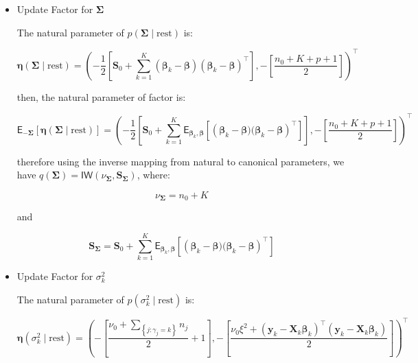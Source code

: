 \begin{appendix}
\begin{itemize}
and

\begin{equation}
\bm{\mu}_{\bm{\beta}}= \left[\bm{\Lambda}_0^{-1}   + \sum_{k=1}^{K}\mathsf{E}_{\bm{\Sigma}}\left[\bm{\Sigma}^{-1}\right]  \right]^{-1}\left[\bm{\Lambda}_0^{-1} \bm{\mu}_0 + \sum_{k=1}^{K}\mathsf{E}_{\bm{\Sigma}}\left[\bm{\Sigma}^{-1}\right] \mathsf{E}_{\bm{\beta}_k}\left[\bm{\beta}_k \right]\right]
\end{equation}

\item Update Factor for $\bm{\Sigma}$

The natural parameter of $p(\bm{\Sigma}\mid \text{rest}) $ is:

\begin{equation}
\bm{\eta}(\bm{\Sigma}\mid \text{rest})=\left(-\frac{1}{2}\left[ \bm{S}_0 + \sum_{k=1}^{K} (\bm{\beta}_k - \bm{\beta})(\bm{\beta}_k - \bm{\beta})^\top\right],-\left[\frac{n_0 + K + p + 1}{2}\right]\right)^\top
\end{equation}

then, the natural parameter of factor is:

\begin{equation}
\mathsf{E}_{-\bm{\Sigma}}\left[\bm{\eta}(\bm{\Sigma}\mid \text{rest})\right]=\left(-\frac{1}{2}\left[ \bm{S}_0 + \sum_{k=1}^{K} \mathsf{E}_{\bm{\beta}_k,\bm{\beta}}\left[\left(\bm{\beta}_k - \bm{\beta})(\bm{\beta}_k - \bm{\beta}\right)^\top\right]\right],-\left[\frac{n_0 + K + p + 1}{2}\right]\right)^\top
\end{equation}

therefore using the inverse mapping from natural to canonical parameters, we have $q(\bm{\Sigma})=\mathsf{IW}(\nu_{\bm{\Sigma}},\bm{S}_{\bm{\Sigma}})$, where:

\begin{equation}
\nu_{\bm{\Sigma}} = n_0+K
\end{equation}

and

\begin{equation}
\bm{S}_{\bm{\Sigma}}= \bm{S}_0 + \sum_{k=1}^{K} \mathsf{E}_{\bm{\beta}_k,\bm{\beta}}\left[\left(\bm{\beta}_k - \bm{\beta})(\bm{\beta}_k - \bm{\beta}\right)^\top\right]
\end{equation}

\item Update Factor for $\sigma_k^2$

The natural parameter of $p(\sigma_k^2\mid \text{rest}) $ is:

\begin{equation}
\bm{\eta}(\sigma_k^2\mid \text{rest})=\left(-\left[\frac{\nu_0+\sum_{\left\lbrace j : \gamma_j = k\right\rbrace}n_j }{2}+1\right],-\left[ \frac{ \nu_0 \xi^2 +  (\bm{y}_{k} - \bm{X}_{k} \bm{\beta}_k)^\top(\bm{y}_{k} - \bm{X}_{k} \bm{\beta}_k)}{2}\right]\right)^\top
\end{equation}


\end{itemize}
\end{appendix}
